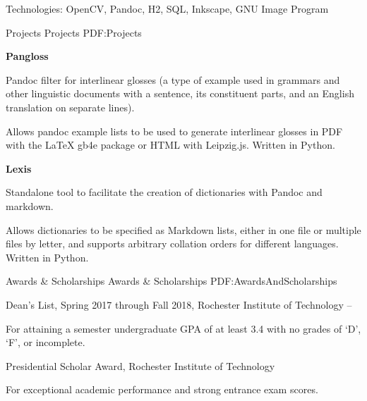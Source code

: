 \documentclass[letterpaper,MMMyyyy,nonstopmode]{simpleresumecv}
\begin{document}
\begin{Body}
\BulletItem
Technologies:
OpenCV,
Pandoc,
H2,
SQL,
Inkscape,
GNU Image Program


\Section
{Projects}
{Projects}
{PDF:Projects}

\BigGap
\Entry
\textbf{Pangloss}

\BulletItem
Pandoc filter for interlinear glosses (a type of example used in grammars and
other linguistic documents with a sentence, its constituent parts, and an
English translation on separate lines).

\Gap
\BulletItem
Allows pandoc example lists to be used to generate interlinear glosses in PDF
with the \LaTeX{} gb4e package or HTML with Leipzig.js. Written in Python.

\BigGap
\Entry
\textbf{Lexis}

\BulletItem
Standalone tool to facilitate the creation of dictionaries with Pandoc and markdown.

\Gap
\BulletItem
Allows dictionaries to be specified as Markdown lists, either in one file or
multiple files by letter, and supports arbitrary collation orders for different
languages. Written in Python.


\Section
{Awards \&\newline
Scholarships}
{Awards \& Scholarships}
{PDF:AwardsAndScholarships}

\BulletItem
Dean's List,
Spring 2017 through Fall 2018,
Rochester Institute of Technology
\hfill
{} --
\begin{Detail}
\Item
For attaining a semester undergraduate GPA of at least 3.4 with no grades of
`D', `F', or incomplete.
\end{Detail}

\Gap
\BulletItem
Presidential Scholar Award,
Rochester Institute of Technology
\hfill
{}
\begin{Detail}
\Item
For exceptional academic performance and strong entrance exam scores.
\end{Detail}


%
%


\end{Body}
\end{document}
